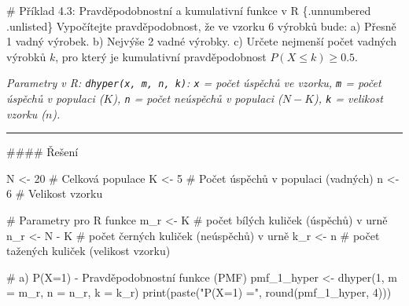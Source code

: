 \documentclass[
  czech,
  11pt,
  letterpaper,
  DIV=11,
  numbers=noendperiod]{scrreprt}
\newenvironment{Shaded}{\begin{snugshade}}{\end{snugshade}}
\newcommand{\AttributeTok}[1]{\textcolor[rgb]{0.40,0.45,0.13}{#1}}
\newcommand{\CommentTok}[1]{\textcolor[rgb]{0.37,0.37,0.37}{#1}}
\newcommand{\DecValTok}[1]{\textcolor[rgb]{0.68,0.00,0.00}{#1}}
\newcommand{\FunctionTok}[1]{\textcolor[rgb]{0.28,0.35,0.67}{#1}}
\newcommand{\NormalTok}[1]{\textcolor[rgb]{0.00,0.23,0.31}{#1}}
\newcommand{\OtherTok}[1]{\textcolor[rgb]{0.00,0.23,0.31}{#1}}
\newcommand{\SpecialCharTok}[1]{\textcolor[rgb]{0.37,0.37,0.37}{#1}}
\newcommand{\StringTok}[1]{\textcolor[rgb]{0.13,0.47,0.30}{#1}}
\begin{document}
\begin{tcolorbox}[enhanced jigsaw, arc=.35mm, bottomrule=.15mm, bottomtitle=1mm, breakable, colback=white, colbacktitle=quarto-callout-note-color!10!white, colframe=quarto-callout-note-color-frame, coltitle=black, left=2mm, leftrule=.75mm, opacityback=0, opacitybacktitle=0.6, rightrule=.15mm, title=\textcolor{quarto-callout-note-color}{\faInfo}\hspace{0.5em}{Poznámka}, titlerule=0mm, toprule=.15mm, toptitle=1mm]

\# Příklad 4.3: Pravděpodobnostní a kumulativní funkce v R \{.unnumbered
.unlisted\} Vypočítejte pravděpodobnost, že ve vzorku 6 výrobků bude: a)
Přesně 1 vadný výrobek. b) Nejvýše 2 vadné výrobky. c) Určete nejmenší
počet vadných výrobků \(k\), pro který je kumulativní pravděpodobnost
\(P(X \le k) \ge 0.5\).

\emph{Parametry v R: \texttt{dhyper(x,\ m,\ n,\ k)}: \texttt{x} = počet
úspěchů ve vzorku, \texttt{m} = počet úspěchů v populaci (\(K\)),
\texttt{n} = počet neúspěchů v populaci (\(N-K\)), \texttt{k} = velikost
vzorku (\(n\)).}

\begin{center}\rule{0.5\linewidth}{0.5pt}\end{center}

\#\#\#\# Řešení

\begin{Shaded}
\begin{Highlighting}[]
\NormalTok{N }\OtherTok{\textless{}{-}} \DecValTok{20} \CommentTok{\# Celková populace}
\NormalTok{K }\OtherTok{\textless{}{-}} \DecValTok{5}  \CommentTok{\# Počet úspěchů v populaci (vadných)}
\NormalTok{n }\OtherTok{\textless{}{-}} \DecValTok{6}  \CommentTok{\# Velikost vzorku}

\CommentTok{\# Parametry pro R funkce}
\NormalTok{m\_r }\OtherTok{\textless{}{-}}\NormalTok{ K }\CommentTok{\# počet bílých kuliček (úspěchů) v urně}
\NormalTok{n\_r }\OtherTok{\textless{}{-}}\NormalTok{ N }\SpecialCharTok{{-}}\NormalTok{ K }\CommentTok{\# počet černých kuliček (neúspěchů) v urně}
\NormalTok{k\_r }\OtherTok{\textless{}{-}}\NormalTok{ n }\CommentTok{\# počet tažených kuliček (velikost vzorku)}

\CommentTok{\# a) P(X=1) {-} Pravděpodobnostní funkce (PMF)}
\NormalTok{pmf\_1\_hyper }\OtherTok{\textless{}{-}} \FunctionTok{dhyper}\NormalTok{(}\DecValTok{1}\NormalTok{, }\AttributeTok{m =}\NormalTok{ m\_r, }\AttributeTok{n =}\NormalTok{ n\_r, }\AttributeTok{k =}\NormalTok{ k\_r)}
\FunctionTok{print}\NormalTok{(}\FunctionTok{paste}\NormalTok{(}\StringTok{"P(X=1) ="}\NormalTok{, }\FunctionTok{round}\NormalTok{(pmf\_1\_hyper, }\DecValTok{4}\NormalTok{)))}


\end{Highlighting}
\end{Shaded}
\end{tcolorbox}
\end{document}
